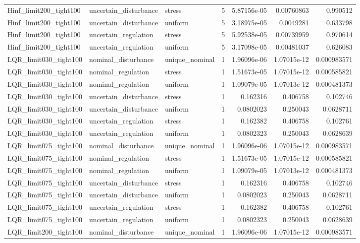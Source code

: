 \begin{tabular}{llllrrr}
Hinf\_limit200\_tight100 & uncertain\_disturbance & stress & 5 & 5.87156e-05 & 0.00760863 & 0.990512 \\
Hinf\_limit200\_tight100 & uncertain\_disturbance & uniform & 5 & 3.18975e-05 & 0.0049281 & 0.633798 \\
Hinf\_limit200\_tight100 & uncertain\_regulation & stress & 5 & 5.92538e-05 & 0.00739959 & 0.970614 \\
Hinf\_limit200\_tight100 & uncertain\_regulation & uniform & 5 & 3.17098e-05 & 0.00481037 & 0.626083 \\
LQR\_limit030\_tight100 & nominal\_disturbance & unique\_nominal & 1 & 1.96096e-06 & 1.07015e-12 & 0.000983571 \\
LQR\_limit030\_tight100 & nominal\_regulation & stress & 1 & 1.51673e-05 & 1.07015e-12 & 0.000585821 \\
LQR\_limit030\_tight100 & nominal\_regulation & uniform & 1 & 1.09079e-05 & 1.07013e-12 & 0.000481373 \\
LQR\_limit030\_tight100 & uncertain\_disturbance & stress & 1 & 0.162316 & 0.406758 & 0.102746 \\
LQR\_limit030\_tight100 & uncertain\_disturbance & uniform & 1 & 0.0802023 & 0.250043 & 0.0628711 \\
LQR\_limit030\_tight100 & uncertain\_regulation & stress & 1 & 0.162382 & 0.406758 & 0.102761 \\
LQR\_limit030\_tight100 & uncertain\_regulation & uniform & 1 & 0.0802323 & 0.250043 & 0.0628639 \\
LQR\_limit075\_tight100 & nominal\_disturbance & unique\_nominal & 1 & 1.96096e-06 & 1.07015e-12 & 0.000983571 \\
LQR\_limit075\_tight100 & nominal\_regulation & stress & 1 & 1.51673e-05 & 1.07015e-12 & 0.000585821 \\
LQR\_limit075\_tight100 & nominal\_regulation & uniform & 1 & 1.09079e-05 & 1.07013e-12 & 0.000481373 \\
LQR\_limit075\_tight100 & uncertain\_disturbance & stress & 1 & 0.162316 & 0.406758 & 0.102746 \\
LQR\_limit075\_tight100 & uncertain\_disturbance & uniform & 1 & 0.0802023 & 0.250043 & 0.0628711 \\
LQR\_limit075\_tight100 & uncertain\_regulation & stress & 1 & 0.162382 & 0.406758 & 0.102761 \\
LQR\_limit075\_tight100 & uncertain\_regulation & uniform & 1 & 0.0802323 & 0.250043 & 0.0628639 \\
LQR\_limit200\_tight100 & nominal\_disturbance & unique\_nominal & 1 & 1.96096e-06 & 1.07015e-12 & 0.000983571 \\

\end{tabular}
